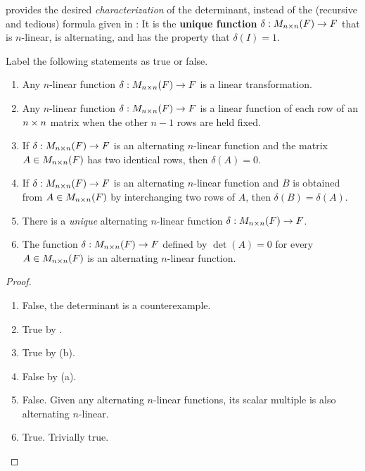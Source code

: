 \begin{remark} \label{remark 4.5.2}
 provides the desired \emph{characterization} of the determinant, instead of the (recursive and tedious) formula given in :
It is the \textbf{unique function} \(\delta: M_{n \times n}(F) \to F\) that is \(n\)-linear, is alternating, and has the property that \(\delta(I) = 1\).
\end{remark}

\exercisesection

\begin{exercise} \label{exercise 4.5.1}
Label the following statements as true or false.
\begin{enumerate}
\item Any \(n\)-linear function \(\delta: M_{n \times n}(F) \to F\) is a linear transformation.
\item Any \(n\)-linear function \(\delta: M_{n \times n}(F) \to F\) is a linear function of each row of an \(n \times n\) matrix when the other \(n - 1\) rows are held fixed.
\item If \(\delta: M_{n \times n}(F) \to F\) is an alternating \(n\)-linear function and the matrix \(A \in M_{n \times n}(F)\) has two identical rows, then \(\delta(A) = 0\).
\item If \(\delta: M_{n \times n}(F) \to F\) is an alternating \(n\)-linear function and \(B\) is obtained from \(A \in M_{n \times n}(F)\) by interchanging two rows of \(A\), then \(\delta(B) = \delta(A)\).
\item There is a \emph{unique} alternating \(n\)-linear function \(\delta: M_{n \times n}(F) \to F\).
\item The function \(\delta: M_{n \times n}(F ) \to F\) defined by \(\det(A) = 0\) for every \(A \in M_{n \times n}(F)\) is an alternating \(n\)-linear function.
\end{enumerate}
\end{exercise}

\begin{proof} \ 

\begin{enumerate}
\item False, the determinant is a counterexample.
\item True by .
\item True by (b).
\item False by (a).
\item False. Given any alternating \(n\)-linear functions, its scalar multiple is also alternating \(n\)-linear.
\item True. Trivially true.
\end{enumerate}
\end{proof}

